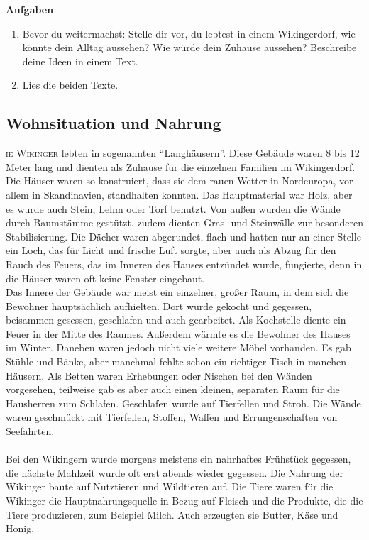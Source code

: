 \documentclass[12pt,a4paper,ngerman,openany]{book}
\newcommand{\flettrine}[2]{\lettrine[lines=2, depth=0, loversize=0.25, nindent=0.69pt, lraise=0.15]{\initfamily{#1}}{#2}}
\newcommand*\initfamily{\usefont{U}{GotIn}{xl}{n}}
\newcommand{\aufgaben}[1]{
  \begin{tcolorbox}
    \textbf{Aufgaben}
    \begin{enumerate}
      #1
    \end{enumerate}
  \end{tcolorbox}
} %
\begin{document}
\aufgaben{
  \item Bevor du weitermachst: Stelle dir vor, du lebtest in einem Wikingerdorf, wie könnte dein Alltag aussehen? Wie würde dein Zuhause aussehen? Beschreibe deine Ideen in einem Text.
  \item Lies die beiden Texte.
}

\subsection{Wohnsituation und Nahrung}
\flettrine{D}{ie Wikinger} lebten in sogenannten “Langhäusern”. Diese Gebäude waren 8 bis 12 Meter lang und dienten als Zuhause für die einzelnen Familien im Wikingerdorf.  Die Häuser waren so konstruiert, dass sie dem rauen Wetter in Nordeuropa, vor allem in Skandinavien, standhalten konnten. Das Hauptmaterial war Holz, aber es wurde auch Stein, Lehm oder Torf benutzt. Von außen wurden die Wände durch Baumstämme gestützt, zudem dienten Gras- und Steinwälle zur besonderen Stabilisierung. Die Dächer waren abgerundet, flach und hatten nur an einer Stelle ein Loch, das für Licht und frische Luft sorgte, aber auch als Abzug für den Rauch des Feuers, das im Inneren des Hauses entzündet wurde,  fungierte, denn in die Häuser waren oft keine Fenster eingebaut.\\
Das Innere der Gebäude war meist ein einzelner, großer Raum, in dem sich die Bewohner hauptsächlich aufhielten. Dort wurde gekocht und gegessen, beisammen gesessen, geschlafen und auch gearbeitet. Als Kochstelle diente ein Feuer in der Mitte des Raumes. Außerdem wärmte es die Bewohner des Hauses im Winter. Daneben waren jedoch nicht viele weitere Möbel vorhanden. Es gab Stühle und Bänke, aber manchmal fehlte schon ein richtiger Tisch in manchen Häusern. Als Betten waren Erhebungen oder Nischen bei den Wänden vorgesehen, teilweise gab es aber auch einen kleinen, separaten Raum für die Hausherren zum Schlafen. Geschlafen wurde auf Tierfellen und Stroh. Die Wände waren geschmückt mit Tierfellen, Stoffen, Waffen und Errungenschaften von Seefahrten.\\\\
Bei den Wikingern wurde morgens meistens ein nahrhaftes Frühstück gegessen, die nächste Mahlzeit wurde oft erst abends wieder gegessen. Die Nahrung der Wikinger baute auf Nutztieren und Wildtieren auf. Die Tiere waren für die Wikinger die Hauptnahrungsquelle in Bezug auf Fleisch und die Produkte, die die Tiere produzieren, zum Beispiel Milch. Auch erzeugten sie Butter, Käse und Honig. \\
\end{document}
